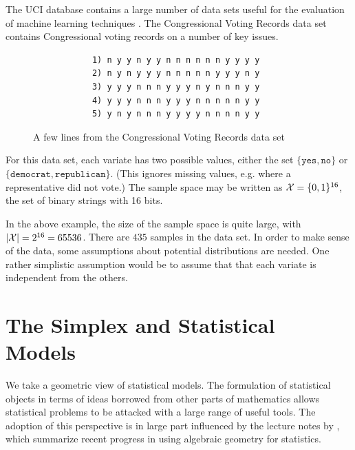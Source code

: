 \documentclass[cclicense]{hmcthesis}
\numberwithin{equation}{chapter}
\numberwithin{ucounter}{chapter}
\begin{document}
    \begin{example}
        The UCI database contains a large number of data sets useful for the
        evaluation of machine learning techniques \citep{UCIData}.  The
        Congressional Voting Records data set contains Congressional voting
        records on a number of key issues.
        \begin{figure}[H]
            \centering
            \begin{verbatim}
            1) n y y n y y n n n n n n y y y y
            2) n y n y y y n n n n n y y y n y
            3) y y y n n n y y y n y n n n y y
            4) y y y n n n y y y n n n n n y y
            5) y n y n n n y y y y n n n n y y
            \end{verbatim}
            \vspace{-1.5\baselineskip}
            \caption{A few lines from the Congressional Voting Records
            data set}
        \end{figure}
        \noindent For this data set, each variate has two possible values,
        either the set $\{\texttt{yes}, \texttt{no}\}$ or $\{\texttt{democrat},
        \texttt{republican}\}$.  (This ignores missing values, e.g.  where a
        representative did not vote.)  The sample space may be written as $\mathcal{X} =
        \{0, 1\}^{16}$, the set of binary strings with 16 bits.  
        \label{ex:binary-voting}
    \end{example}
        
    In the above example, the size of the sample space is quite large, with
    $|\mathcal{X}| = 2^{16} = 65536$.  There are $435$ samples in the data set.  In
    order to make sense of the data, some assumptions about potential
    distributions are needed.  One rather simplistic assumption would be to
    assume that that each variate is independent from the others.

\section{The Simplex and Statistical Models}

    We take a geometric view of statistical models.  The formulation of
    statistical objects in terms of ideas borrowed from other parts of
    mathematics allows statistical problems to be attacked with a large range of
    useful tools.  The adoption of this perspective is in large part influenced
    by the lecture notes by \citet{DSS08}, which summarize recent progress in
    using algebraic geometry for statistics.
\end{document}
